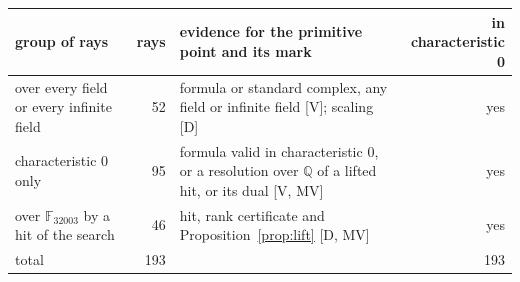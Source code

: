 \begin{tabular}{@{}>{\raggedright\arraybackslash}p{4.2cm}r>{\raggedright\arraybackslash}p{6.2cm}r@{}}
\toprule
group of rays & rays & evidence for the primitive point and its mark & in characteristic 0\\
\midrule
over every field or every infinite field & 52 & formula or standard complex, any field or infinite field [V]; scaling [D] & yes\\
characteristic 0 only & 95 & formula valid in characteristic 0, or a resolution over $\mathbb{Q}$ of a lifted hit, or its dual [V, MV] & yes\\
over $\mathbb{F}_{32003}$ by a hit of the search & 46 & hit, rank certificate and Proposition~\ref{prop:lift} [D, MV] & yes\\
total & 193 &  & 193\\
\bottomrule
\end{tabular}
